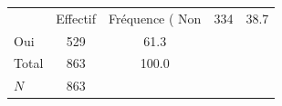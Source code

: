 {
\def\sym#1{\ifmmode^{#1}\else\(^{#1}\)\fi}
\begin{tabular}{l*{1}{cc}}
\toprule
            &    Effectif&Fréquence (%
\midrule
Non         &         334&        38.7\\
Oui         &         529&        61.3\\
Total       &         863&       100.0\\
\midrule
\(N\)       &         863&            \\
\bottomrule
\end{tabular}
}
